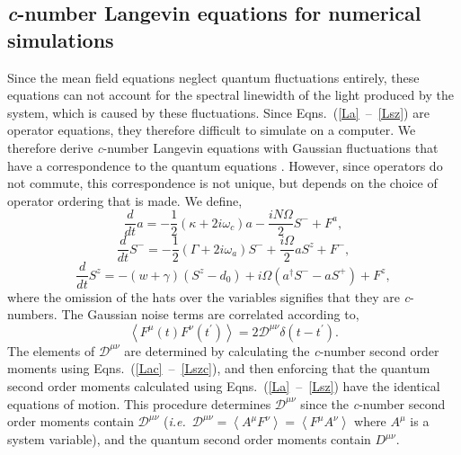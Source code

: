 \documentclass[aps,
twocolumn,
superscriptaddress,groupedaddress]{revtex4}
\begin{document}
\subsection{{\it c}-number Langevin equations for numerical simulations}
Since the mean field equations neglect quantum fluctuations entirely, these equations can not account for the spectral linewidth of the light produced by the system, which is caused by these fluctuations. Since Eqns.~(\ref{La}~--~\ref{Lsz}) are operator equations, they therefore difficult to simulate on a computer. We therefore derive {\it c}-number
Langevin equations with Gaussian fluctuations that have a correspondence to the quantum equations \cite{Scully97}. However, since operators do not commute, this correspondence is not unique, but depends on the choice of operator ordering that is made. We define,
\begin{equation}
\frac{d}{dt} a= -\frac{1}{2}  (\kappa +2i\omega_c) a
-\frac{i N \Omega}{2} S^{-}
+F^{a},
\label{Lac}
\end{equation}
\begin{equation}
\frac{d}{dt} S^{-} = -\frac{1}{2}  \left(\Gamma +2 i \omega_a \right)  S^{-}
+\frac{i \Omega}{2} a S^{z}
+F^{-},
\end{equation}
\begin{equation}
\frac{d}{dt} S^{z} = -(w+\gamma)\left( S^{z} - d_0\right)
+i\Omega \left( a^{\dagger}S^{-} - a S^{+} \right)
\label{Lszc}
+F^{z},
\end{equation}
where the omission of the hats over the variables signifies that they
are {\it c}-numbers. The Gaussian noise terms are correlated according to,
\begin{equation}
\left< F^{\mu}(t) F^{\nu}(t^{\prime})\right> =
2 \mathscr{D}^{\mu \nu} \delta(t-t^{\prime}).
\label{ClassicalDiffusion1}
\end{equation}
The elements of $\mathscr{D}^{\mu \nu}$ are determined by calculating the
{\it c}-number second order moments using Eqns.~(\ref{Lac}~--~\ref{Lszc}), and then enforcing that the quantum second order moments calculated using Eqns.~(\ref{La}~--~\ref{Lsz}) have the identical equations of motion. This procedure determines $\mathscr{D}^{\mu \nu}$ since the {\it c}-number second order moments contain $\mathscr{D}^{\mu \nu}$ ({\em i.e.}\ $\mathscr{D}^{\mu \nu} =
\left<A^{\mu}F^{\nu}\right>=\left<F^{\mu}A^{\nu}\right>$ where $A^{\mu}$
is a system variable), and the quantum second order moments contain $D^{\mu \nu}$.
\end{document}
